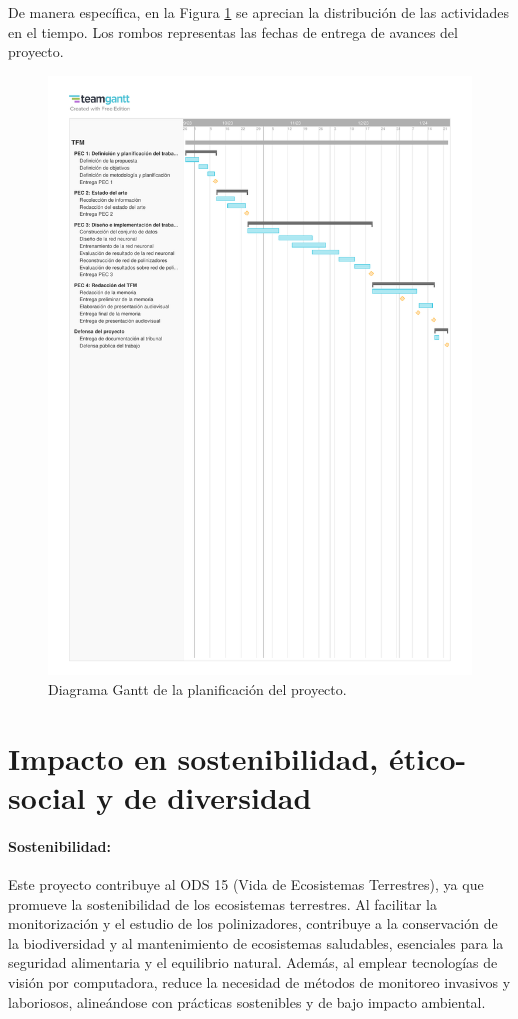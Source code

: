 De manera específica, en la Figura \ref{fig:plan} se aprecian la distribución de las actividades en el tiempo. Los rombos representas las fechas de entrega de avances del proyecto.

\begin{figure}[H]
    \centering
    \includegraphics[width=1.44\textwidth,angle=90]{Figuras/PlanTFM.pdf}
    \caption{Diagrama Gantt de la planificación del proyecto.}
    \label{fig:plan}
\end{figure}


\section{Impacto en sostenibilidad, ético-social y de diversidad}

\paragraph{Sostenibilidad:} Este proyecto contribuye al ODS 15 (Vida de Ecosistemas Terrestres), ya que promueve la sostenibilidad de los ecosistemas terrestres. Al facilitar la monitorización y el estudio de los polinizadores, contribuye a la conservación de la biodiversidad y al mantenimiento de ecosistemas saludables, esenciales para la seguridad alimentaria y el equilibrio natural. Además, al emplear tecnologías de visión por computadora, reduce la necesidad de métodos de monitoreo invasivos y laboriosos, alineándose con prácticas sostenibles y de bajo impacto ambiental.

